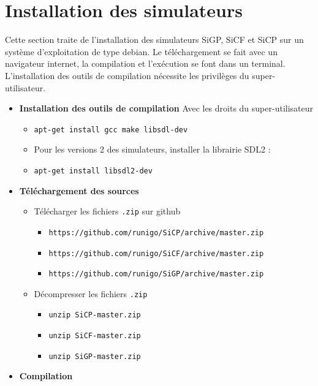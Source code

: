 \section{Installation des simulateurs}
Cette section traite de l'installation des simulateurs SiGP, SiCF et SiCP sur un système d'exploitation de type debian. Le téléchargement se fait avec un navigateur internet, la compilation et l'exécution se font dans un terminal. L'installation des outils de compilation nécessite les privilèges du super-utilisateur.
\begin{itemize}[leftmargin=1cm, label=, itemsep=0pt]
\item {\bf Installation des outils de compilation}
Avec les droits du super-utilisateur
	\begin{itemize}[leftmargin=1cm, label=, itemsep=0pt]
	\item \texttt{apt-get install gcc make libsdl-dev}
	\item Pour les versions 2 des simulateurs, installer la librairie SDL2 :
	\item \texttt{apt-get install libsdl2-dev}
	\end{itemize}
\item {\bf Téléchargement des sources}
	\begin{itemize}[leftmargin=1cm, label=, itemsep=0pt]
	\item Télécharger les fichiers \texttt{.zip} sur github
		\begin{itemize}[leftmargin=1cm, label=, itemsep=0pt]
		\item \texttt{https://github.com/runigo/SiCP/archive/master.zip}
		\item \texttt{https://github.com/runigo/SiCF/archive/master.zip}
		\item \texttt{https://github.com/runigo/SiGP/archive/master.zip}
		\end{itemize}
	\item Décompresser les fichiers \texttt{.zip}
		\begin{itemize}[leftmargin=1cm, label=, itemsep=0pt]
		\item \texttt{unzip SiCP-master.zip}
		\item \texttt{unzip SiCF-master.zip}
		\item \texttt{unzip SiGP-master.zip}
		\end{itemize}
	\end{itemize}
\item {\bf Compilation}
	\begin{itemize}[leftmargin=1cm, label=, itemsep=0pt]

\end{itemize}
\end{itemize}
